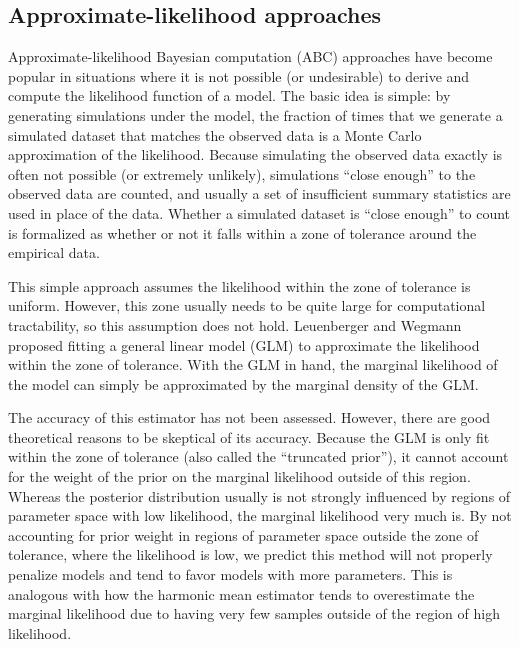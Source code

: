 \subsection{Approximate-likelihood approaches}

Approximate-likelihood Bayesian computation (ABC) approaches
\citep{Tavare1997,Beaumont2002} have become popular in situations where it is
not possible (or undesirable) to derive and compute the likelihood function of
a model.
The basic idea is simple: by generating simulations under the model, the
fraction of times that we generate a simulated dataset that matches the
observed data is a Monte Carlo approximation of the likelihood.
Because simulating the observed data exactly is often not possible (or extremely
unlikely), simulations ``close enough'' to the observed data are
counted, and usually a set of insufficient summary statistics are used in place
of the data.
Whether a simulated dataset is ``close enough'' to count is formalized as
whether or not it falls within a zone of tolerance around the empirical data.

This simple approach assumes the likelihood within the zone of tolerance is
uniform.
However, this zone usually needs to be quite large for computational
tractability, so this assumption does not hold.
Leuenberger and Wegmann \citep{Leuenberger2010} proposed fitting a general
linear model (GLM) to approximate the likelihood within the zone of tolerance.
With the GLM in hand, the marginal likelihood of the model can simply be
approximated by the marginal density of the GLM.

The accuracy of this estimator has not been assessed.
However, there are good theoretical reasons to be skeptical of its accuracy.
Because the GLM is only fit within the zone of tolerance (also called the
``truncated prior''), it cannot account for the weight of the prior on the
marginal likelihood outside of this region.
Whereas the posterior distribution usually is not strongly influenced by
regions of parameter space with low likelihood, the marginal likelihood very
much is.
By not accounting for prior weight in regions of parameter space outside the
zone of tolerance, where the likelihood is low, we predict this method will not
properly penalize models and tend to favor models with more parameters.
This is analogous with how the harmonic mean estimator tends to overestimate
the marginal likelihood due to having very few samples outside of the region of
high likelihood.

